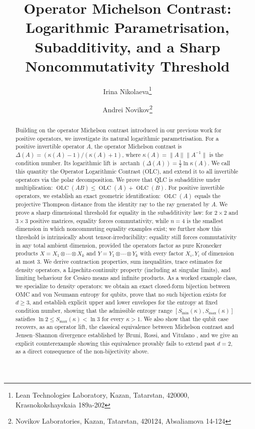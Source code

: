 \documentclass{article}
\title{Operator Michelson Contrast: Logarithmic Parametrisation, Subadditivity, and a Sharp Noncommutativity Threshold}
\author{Irina Nikolaeva\thanks{Lean Technologies Laboratory, Kazan, Tatarstan, 420000, Krasnokokshayskaia 189a-202} \and Andrei Novikov\thanks{Novikov Laboratories, Kazan, Tatarstan, 420124, Absaliamova 14-124}}
\date{}
\theoremstyle{remark}
\providecommand{\QLC}{\operatorname{OLC}}
\begin{document}
\maketitle

\begin{abstract}
Building on the operator Michelson contrast introduced in our previous work for positive operators, we investigate its natural logarithmic parametrisation. For a positive invertible operator $A$, the operator Michelson contrast is $\Delta(A) = (\kappa(A)-1)/(\kappa(A)+1)$, where $\kappa(A) = \|A\|\|A^{-1}\|$ is the condition number. Its logarithmic lift is $\operatorname{arctanh}(\Delta(A)) = \tfrac12\ln\kappa(A)$. We call this quantity the Operator Logarithmic Contrast (OLC), and extend it to all invertible operators via the polar decomposition. We prove that QLC is subadditive under multiplication: $\QLC(AB)\le\QLC(A)+\QLC(B)$. For positive invertible operators, we establish an exact geometric identification: $\QLC(A)$ equals the projective Thompson distance from the identity ray to the ray generated by $A$. We prove a sharp dimensional threshold for equality in the subadditivity law: for $2\times2$ and $3\times3$ positive matrices, equality forces commutativity, while $n=4$ is the smallest dimension in which noncommuting equality examples exist; we further show this threshold is intrinsically about tensor-irreducibility: equality still forces commutativity in any total ambient dimension, provided the operators factor as pure Kronecker products $X=X_1\otimes\cdots\otimes X_k$ and $Y=Y_1\otimes\cdots\otimes Y_k$ with every factor $X_i,Y_i$ of dimension at most $3$. We derive contraction properties, sum inequalities, trace estimates for density operators, a Lipschitz-continuity property (including at singular limits), and limiting behaviour for Ces\`aro means and infinite products. As a worked example class, we specialize to density operators: we obtain an exact closed-form bijection between OMC and von Neumann entropy for qubits, prove that no such bijection exists for $d\ge3$, and establish explicit upper and lower envelopes for the entropy at fixed condition number, showing that the admissible entropy range $[S_{\min}(\kappa), S_{\max}(\kappa)]$ satisfies $\ln 2 \le S_{\max}(\kappa) < \ln 3$ for every $\kappa>1$. We also show that the qubit case recovers, as an operator lift, the classical equivalence between Michelson contrast and Jensen--Shannon divergence established by Bruni, Rossi, and Vitulano \cite{bruni2012}, and we give an explicit counterexample showing this equivalence provably fails to extend past $d=2$, as a direct consequence of the non-bijectivity above.
\end{abstract}
\end{document}
